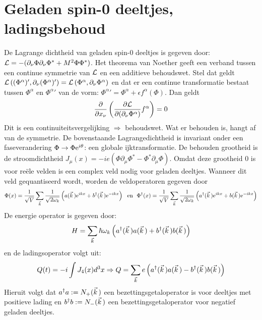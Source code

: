 \section[~~Geladen spin-0 deeltjes, ladingsbehoud]{Geladen spin-0 deeltjes, ladingsbehoud}
De Lagrange dichtheid van geladen spin-0 deeltjes is gegeven door:
${\cal L}=-(\partial_\nu\Phi\partial_\nu\Phi^*+M^2\Phi\Phi^*)$.
\npar
Het theorema van Noether geeft een verband tussen een continue symmetrie van
${\cal L}$ en een additieve behoudswet. Stel dat geldt
${\cal L}\left((\Phi^\alpha)',\partial_\nu(\Phi^\alpha)'\right)=
{\cal L}\left(\Phi^\alpha,\partial_\nu\Phi^\alpha\right)$ en dat er een continue
transformatie bestaat tussen $\Phi^\alpha$ en ${\Phi^\alpha}'$ van de vorm:
${\Phi^\alpha}'=\Phi^\alpha+\epsilon f^\alpha(\Phi)$. Dan geldt
\[
\frac{\partial }{\partial x_\nu}\left(\frac{\partial {\cal L}}{\partial (\partial_\nu\Phi^\alpha)}f^\alpha\right)=0
\]
Dit is een continuiteitsvergelijking $\Rightarrow$ behoudswet. Wat er
behouden is, hangt af van de symmetrie. De bovenstaande Lagrangedichtheid is
invariant onder een faseverandering $\Phi\rightarrow\Phi{\rm e}^{i\theta}$:
een globale ijktransformatie. De behouden grootheid is de stroomdichtheid
$J_\mu(x)=-ie(\Phi\partial_\mu\Phi^*-\Phi^*\partial_\mu\Phi)$. Omdat deze
grootheid 0 is voor re\"ele velden is een complex veld nodig voor geladen
deeltjes. Wanneer dit veld gequantiseerd wordt, worden de veldoperatoren
gegeven door
\[
\Phi(x)=\frac{1}{\sqrt{V}}\sum_{\vec{k}}\frac{1}{\sqrt{2\omega_k}}
\left(a(\vec{k}\,){\rm e}^{ikx}+b^\dagger(\vec{k}\,){\rm e}^{-ikx}\right)
~~\mbox{en}~~
\Phi^\dagger(x)=\frac{1}{\sqrt{V}}\sum_{\vec{k}}\frac{1}{\sqrt{2\omega_k}}
\left(a^\dagger(\vec{k}\,){\rm e}^{ikx}+b(\vec{k}\,){\rm e}^{-ikx}\right)
\]
De energie operator is gegeven door:
\[
H=\sum_{\vec{k}}\hbar\omega_k\left(a^\dagger(\vec{k}\,)a(\vec{k}\,)+b^\dagger(\vec{k}\,)b(\vec{k}\,)\right)
\]
en de ladingsoperator volgt uit:
\[
Q(t)=-i\int J_4(x)d^3x\Rightarrow Q=\sum_{\vec{k}}e\left(a^\dagger(\vec{k}\,)a(\vec{k}\,)-b^\dagger(\vec{k}\,)b(\vec{k}\,)\right)
\]
Hieruit volgt dat $a^\dagger a:=N_+(\vec{k}\,)$ een bezettingsgetaloperator is
voor deeltjes met positieve lading en $b^\dagger b:=N_-(\vec{k}\,)$ een
bezettingsgetaloperator voor negatief geladen deeltjes.

